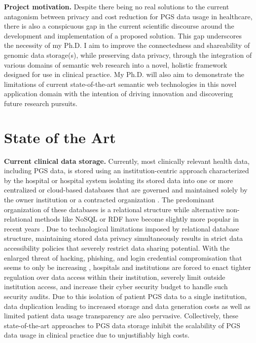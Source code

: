 \documentclass[runningheads]{llncs}
\begin{document}
\textbf{Project motivation.}
Despite there being no real solutions to the current antagonism between privacy and cost reduction for PGS data usage in healthcare, there is also a conspicuous gap in the current scientific discourse around the development and implementation of a proposed solution. 
This gap underscores the necessity of my Ph.D.
I aim to improve the connectedness and shareability of genomic data storage(s), while preserving data privacy, through the integration of various domains of semantic web research into a novel, holistic framework designed for use in clinical practice. 
My Ph.D. will also aim to demonstrate the limitations of current state-of-the-art semantic web technologies in this novel application domain with the intention of driving innovation and discovering future research pursuits.


\section{State of the Art}

\textbf{Current clinical data storage.}
Currently, most clinically relevant health data, including PGS data, is stored using an institution-centric approach characterized by the hospital or hospital system isolating its stored data into one or more centralized or cloud-based databases that are governed and maintained solely by the owner institution or a contracted organization \cite{quantin_medical_2011}. 
The predominant organization of these databases is a relational structure while alternative non-relational methods like NoSQL or RDF have become slightly more popular in recent years \cite{kotsilieris_efficient_2021}.
Due to technological limitations imposed by relational database structure, maintaining stored data privacy simultaneously results in strict data accessibility policies that severely restrict data sharing potential.
With the enlarged threat of hacking, phishing, and login credential compromisation that seems to only be increasing \cite{noauthor_ransomware_nodate}, hospitals and institutions are forced to enact tighter regulation over data access within their institution, severely limit outside institution access, and increase their cyber security budget to handle such security audits.  
Due to this isolation of patient PGS data to a single institution, data duplication leading to increased storage and data generation costs as well as limited patient data usage transparency are also pervasive.
Collectively, these state-of-the-art approaches to PGS data storage inhibit the scalability of PGS data usage in clinical practice due to unjustifiably high costs.
\end{document}
